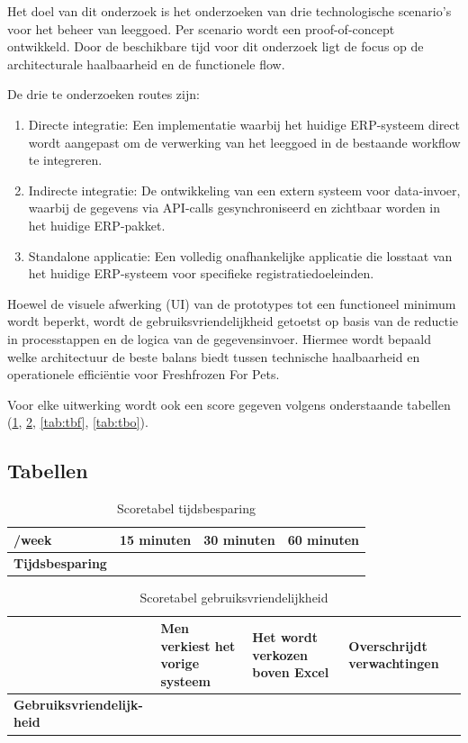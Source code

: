 Het doel van dit onderzoek is het onderzoeken van drie technologische scenario's voor het beheer van leeggoed. Per scenario wordt een proof-of-concept ontwikkeld. Door de beschikbare tijd voor dit onderzoek ligt de focus op de architecturale haalbaarheid en de functionele flow.

De drie te onderzoeken routes zijn:

\begin{enumerate}
    \item Directe integratie: Een implementatie waarbij het huidige ERP-systeem direct wordt aangepast om de verwerking van het leeggoed in de bestaande workflow te integreren.
    \item Indirecte integratie: De ontwikkeling van een extern systeem voor data-invoer, waarbij de gegevens via API-calls gesynchroniseerd en zichtbaar worden in het huidige ERP-pakket.
    \item Standalone applicatie: Een volledig onafhankelijke applicatie die losstaat van het huidige ERP-systeem voor specifieke registratiedoeleinden.
\end{enumerate}

Hoewel de visuele afwerking (UI) van de prototypes tot een functioneel minimum wordt beperkt, wordt de gebruiksvriendelijkheid getoetst op basis van de reductie in processtappen en de logica van de gegevensinvoer. Hiermee wordt bepaald welke architectuur de beste balans biedt tussen technische haalbaarheid en operationele efficiëntie voor Freshfrozen For Pets.

Voor elke uitwerking wordt ook een score gegeven volgens onderstaande tabellen (\ref{tab:tbt}, \ref{tab:tbgeb}, \ref{tab:tbf}, \ref{tab:tbo}). 
\subsection{Tabellen}
\begin{table}[h]
    \centering   
    \begin{tabular}{|p{4cm}|p{3cm}|p{3cm}|p{3cm}|}
        \hline
        /week & \textbf{15 minuten} & \textbf{30 minuten} & \textbf{60 minuten} \\
        \hline
        \textbf{Tijdsbesparing} &  &  &  \\
        \hline
    \end{tabular}
    \caption[Scoretabel tijd]{\label{tab:tbt}Scoretabel tijdsbesparing}
\end{table}

\begin{table}[h]
    \centering   
    \begin{tabular}{|p{4cm}|p{3cm}|p{3cm}|p{3cm}|}
        \hline
        & \textbf{Men verkiest het vorige systeem} & \textbf{Het wordt verkozen boven Excel} & \textbf{Overschrijdt verwachtingen} \\
        \hline
        \textbf{Gebruiksvriendelijk-heid} &  &  &  \\
        \hline
    \end{tabular}
    \caption[Scoretabel gebruik]{\label{tab:tbgeb}Scoretabel gebruiksvriendelijkheid}
\end{table}


